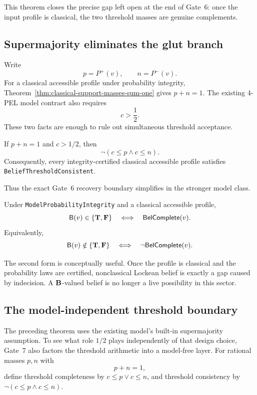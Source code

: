This theorem closes the precise gap left open at the end of Gate~6: once the input
profile is classical, the two threshold masses are genuine complements.

\subsection{Supermajority eliminates the glut branch}

Write
\[
  p=P^+(v),\qquad n=P^-(v).
\]
For a classical accessible profile under probability integrity,
Theorem~\ref{thm:classical-support-masses-sum-one} gives \(p+n=1\).  The existing
4-PEL model contract also requires
\[
  c>\frac12.
\]
These two facts are enough to rule out simultaneous threshold acceptance.

\begin{theorem}
\label{thm:supermajority-threshold-consistency}
If \(p+n=1\) and \(c>1/2\), then
\[
  \neg(c\le p\land c\le n).
\]
Consequently, every integrity-certified classical accessible profile satisfies
\texttt{BeliefThresholdConsistent}.
\statusverified
\end{theorem}

Thus the exact Gate~6 recovery boundary simplifies in the stronger model class.

\begin{corollary}
\label{cor:belief-classical-iff-complete-integrity}
Under \texttt{ModelProbabilityIntegrity} and a classical accessible profile,
\[
  \mathsf{B}(v)\in\{\mathbf{T},\mathbf{F}\}
  \quad\Longleftrightarrow\quad
  \mathsf{BelComplete}(v).
\]
Equivalently,
\[
  \mathsf{B}(v)\notin\{\mathbf{T},\mathbf{F}\}
  \quad\Longleftrightarrow\quad
  \neg\mathsf{BelComplete}(v).
\]
\statusverified
\end{corollary}

The second form is conceptually useful.  Once the profile is classical and the
probability laws are certified, nonclassical Lockean belief is exactly a gap caused
by indecision.  A \(\mathbf{B}\)-valued belief is no longer a live possibility in this
sector.

\subsection{The model-independent threshold boundary}

The preceding theorem uses the existing model's built-in supermajority assumption.
To see what role \(1/2\) plays independently of that design choice, Gate~7 also
factors the threshold arithmetic into a model-free layer.  For rational masses
\(p,n\) with
\[
  p+n=1,
\]
define threshold completeness by \(c\le p\lor c\le n\), and threshold consistency
by \(\neg(c\le p\land c\le n)\).

